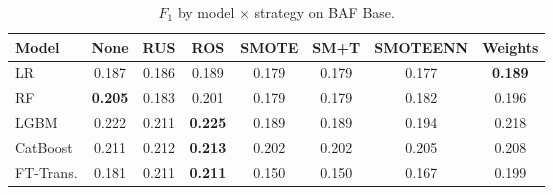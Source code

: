 \begin{table}[ht!]
\centering
\caption{$F_1$ by model $\times$ strategy on BAF Base.}
\label{tab:factorial_baf_f1}
\begin{tabular}{l c c c c c c c}
\toprule
Model & None & RUS & ROS & SMOTE & SM+T & SMOTEENN & Weights \\
\midrule
LR         & 0.187 & 0.186 & 0.189 & 0.179 & 0.179 & 0.177 & \textbf{0.189} \\
RF         & \textbf{0.205} & 0.183 & 0.201 & 0.179 & 0.179 & 0.182 & 0.196 \\
LGBM       & 0.222 & 0.211 & \textbf{0.225} & 0.189 & 0.189 & 0.194 & 0.218 \\
CatBoost   & 0.211 & 0.212 & \textbf{0.213} & 0.202 & 0.202 & 0.205 & 0.208 \\
FT-Trans.  & 0.181 & 0.211 & \textbf{0.211} & 0.150 & 0.150 & 0.167 & 0.199 \\
\bottomrule
\end{tabular}
\end{table}